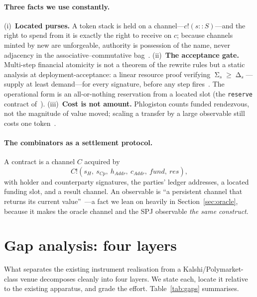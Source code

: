 \documentclass[11pt]{article}
\DeclareMathOperator{\Demand}{\Delta}
\DeclareMathOperator{\Supply}{\Sigma}
\begin{document}
\paragraph{Three facts we use constantly.} (i)~\textbf{Located purses.} A token stack is held
on a channel---$c!(s::S)$---and the right to spend from it is exactly the right to receive on
$c$; because channels minted by \textsf{new} are unforgeable, authority is possession of the
name, never adjacency in the associative--commutative bag~\cite[\S3.2]{finrho}. (ii)~\textbf{The
acceptance gate.} Multi-step financial atomicity is not a theorem of the rewrite rules but a
static analysis at deployment-acceptance: a linear resource proof verifying
$\Supply_s \ge \Demand_s$---supply at least demand---for every signature, before any step
fires~\cite[\S3.3]{finrho}. The operational form is an all-or-nothing reservation from a
located slot (the \texttt{reserve} contract of~\cite[Listing~1]{finrho}). (iii)~\textbf{Cost is
not amount.} Phlogiston counts funded rendezvous, not the magnitude of value moved; scaling a
transfer by a large observable still costs one token~\cite[\S3.6]{finrho}.

\paragraph{The combinators as a settlement protocol.} A contract is a channel $C$ acquired by
\[
C!(s_H,\ s_{Cp},\ h_{\mathit{Addr}},\ c_{\mathit{Addr}},\ \mathit{fund},\ \mathit{res}),
\]
with holder and counterparty signatures, the parties' ledger addresses, a located funding slot,
and a result channel. An observable is ``a persistent channel that returns its current
value''~\cite[\S2.2]{finrho}---a fact we lean on heavily in Section~\ref{sec:oracle}, because
it makes the oracle channel and the SPJ observable \emph{the same construct}.

\section{Gap analysis: four layers}\label{sec:gaps}

What separates the existing instrument realisation from a Kalshi/Polymarket-class venue
decomposes cleanly into four layers. We state each, locate it relative to the existing
apparatus, and grade the effort. Table~\ref{tab:gaps} summarises.
\end{document}
